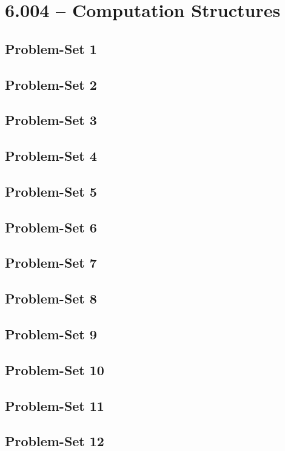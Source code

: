 \section{6.004 -- Computation Structures}
\subsection{Problem-Set 1}
\subsection{Problem-Set 2}
\subsection{Problem-Set 3}
\subsection{Problem-Set 4}
\subsection{Problem-Set 5}
\subsection{Problem-Set 6}
\subsection{Problem-Set 7}
\subsection{Problem-Set 8}
\subsection{Problem-Set 9}
\subsection{Problem-Set 10}
\subsection{Problem-Set 11}
\subsection{Problem-Set 12}

